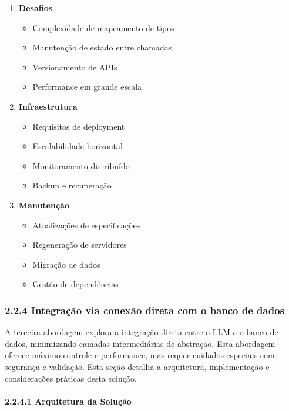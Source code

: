 \documentclass[
]{article}
\providecommand{\tightlist}{%
  \setlength{\itemsep}{0pt}\setlength{\parskip}{0pt}}
\begin{document}
\begin{enumerate}
\def\labelenumi{\arabic{enumi}.}
\tightlist
\item
  \textbf{Desafios}

  \begin{itemize}
  \tightlist
  \item
    Complexidade de mapeamento de tipos
  \item
    Manutenção de estado entre chamadas
  \item
    Versionamento de APIs
  \item
    Performance em grande escala
  \end{itemize}
\item
  \textbf{Infraestrutura}

  \begin{itemize}
  \tightlist
  \item
    Requisitos de deployment
  \item
    Escalabilidade horizontal
  \item
    Monitoramento distribuído
  \item
    Backup e recuperação
  \end{itemize}
\item
  \textbf{Manutenção}

  \begin{itemize}
  \tightlist
  \item
    Atualizações de especificações
  \item
    Regeneração de servidores
  \item
    Migração de dados
  \item
    Gestão de dependências
  \end{itemize}
\end{enumerate}

\subsubsection{2.2.4 Integração via conexão direta com o banco de
dados}\label{integrauxe7uxe3o-via-conexuxe3o-direta-com-o-banco-de-dados}

A terceira abordagem explora a integração direta entre o LLM e o banco
de dados, minimizando camadas intermediárias de abstração. Esta
abordagem oferece máximo controle e performance, mas requer cuidados
especiais com segurança e validação. Esta seção detalha a arquitetura,
implementação e considerações práticas desta solução.

\paragraph{2.2.4.1 Arquitetura da
Solução}\label{arquitetura-da-soluuxe7uxe3o-2}
\end{document}
